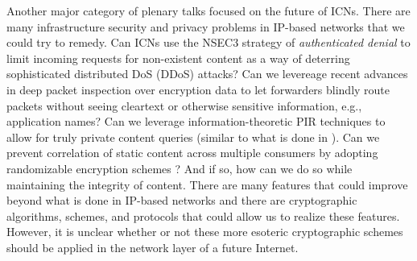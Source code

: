 Another major category of plenary talks focused on the future of ICNs. There are many infrastructure
security and privacy problems in IP-based networks that we could try to remedy. 
Can ICNs use the NSEC3 strategy of \emph{authenticated denial} \cite{blacka2008dns} to limit incoming requests
for non-existent content as a way of deterring sophisticated distributed DoS (DDoS) attacks?
Can we levereage recent advances in deep packet inspection over encryption data \cite{sherry2015blindbox}
to let forwarders blindly route packets without seeing cleartext or otherwise sensitive information,
e.g., application names? Can we leverage information-theoretic PIR techniques to allow for 
truly private content queries (similar to what is done in \cite{pir-icn}). Can we prevent correlation
of static content across multiple consumers by adopting randomizable encryption schemes \cite{blazy2011signatures}? 
And if so, how can we do so while maintaining the integrity of content. There are many 
features that could improve beyond what is done in IP-based networks and there are cryptographic
algorithms, schemes, and protocols that could allow us to realize these features. However,
it is unclear whether or not these more esoteric cryptographic schemes should be applied in
the network layer of a future Internet. 


